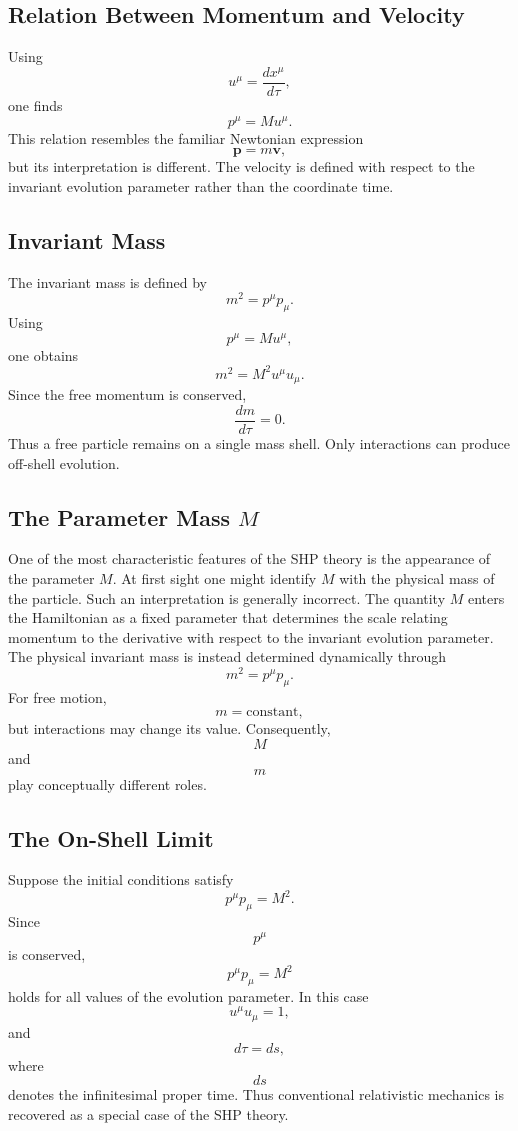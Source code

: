 \subsection{Relation Between Momentum and Velocity}
Using
\[u^\mu=\frac{dx^\mu}{d\tau},\]
one finds
\[\boxed{p^\mu=Mu^\mu.}\]
This relation resembles the familiar Newtonian expression
\[\mathbf{p}=m\mathbf{v},\]
but its interpretation is different.
The velocity is defined with respect to the invariant evolution
parameter rather than the coordinate time.
\subsection{Invariant Mass}
The invariant mass is defined by
\[\boxed{m^2=p^\mu p_\mu.}\]
Using
\[p^\mu=Mu^\mu,\]
one obtains
\[m^2=M^2 u^\mu u_\mu.\]
Since the free momentum is conserved,
\[\boxed{\frac{dm}{d\tau}=0.}\]
Thus a free particle remains on a single mass shell.
Only interactions can produce off-shell evolution.
\subsection{The Parameter Mass \(M\)}
One of the most characteristic features of the SHP theory is the
appearance of the parameter \(M\).
At first sight one might identify \(M\) with the physical mass of the
particle.
Such an interpretation is generally incorrect.
The quantity \(M\) enters the Hamiltonian as a fixed parameter that
determines the scale relating momentum to the derivative with respect to
the invariant evolution parameter.
The physical invariant mass is instead determined dynamically through
\[m^2=p^\mu p_\mu.\]
For free motion,
\[m=\mathrm{constant},\]
but interactions may change its value.
Consequently,
\[M\]
and
\[m\]
play conceptually different roles.
\subsection{The On-Shell Limit}
Suppose the initial conditions satisfy
\[p^\mu p_\mu=M^2.\]
Since
\[p^\mu\]
is conserved,
\[p^\mu p_\mu=M^2\]
holds for all values of the evolution parameter.
In this case
\[u^\mu u_\mu=1,\]
and
\[d\tau=ds,\]
where
\[ds\]
denotes the infinitesimal proper time.
Thus conventional relativistic mechanics is recovered as a special case
of the SHP theory.
